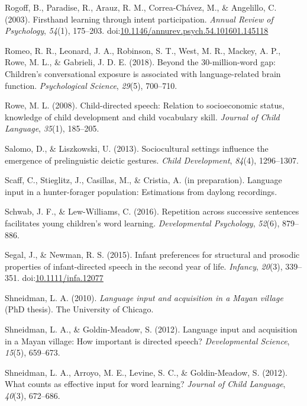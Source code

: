 \documentclass[floatsintext,man]{apa6}
\theoremstyle{definition}
\theoremstyle{definition}
\theoremstyle{definition}
\theoremstyle{remark}
\begin{document}
\hypertarget{ref-rogoff2003firsthand}{}
Rogoff, B., Paradise, R., Arauz, R. M., Correa-Chávez, M., \& Angelillo,
C. (2003). Firsthand learning through intent participation. \emph{Annual
Review of Psychology}, \emph{54}(1), 175--203.
doi:\href{https://doi.org/10.1146/annurev.psych.54.101601.145118}{10.1146/annurev.psych.54.101601.145118}

\hypertarget{ref-romeo2018beyond}{}
Romeo, R. R., Leonard, J. A., Robinson, S. T., West, M. R., Mackey, A.
P., Rowe, M. L., \& Gabrieli, J. D. E. (2018). Beyond the
30-million-word gap: Children's conversational exposure is associated
with language-related brain function. \emph{Psychological Science},
\emph{29}(5), 700--710.

\hypertarget{ref-rowe2008child}{}
Rowe, M. L. (2008). Child-directed speech: Relation to socioeconomic
status, knowledge of child development and child vocabulary skill.
\emph{Journal of Child Language}, \emph{35}(1), 185--205.

\hypertarget{ref-salomo2013sociocultural}{}
Salomo, D., \& Liszkowski, U. (2013). Sociocultural settings influence
the emergence of prelinguistic deictic gestures. \emph{Child
Development}, \emph{84}(4), 1296--1307.

\hypertarget{ref-scaffIPlanguage}{}
Scaff, C., Stieglitz, J., Casillas, M., \& Cristia, A. (in preparation).
Language input in a hunter-forager population: Estimations from daylong
recordings.

\hypertarget{ref-schwab2016repetition}{}
Schwab, J. F., \& Lew-Williams, C. (2016). Repetition across successive
sentences facilitates young children's word learning.
\emph{Developmental Psychology}, \emph{52}(6), 879--886.

\hypertarget{ref-segal2015infant}{}
Segal, J., \& Newman, R. S. (2015). Infant preferences for structural
and prosodic properties of infant-directed speech in the second year of
life. \emph{Infancy}, \emph{20}(3), 339--351.
doi:\href{https://doi.org/10.1111/infa.12077}{10.1111/infa.12077}

\hypertarget{ref-shneidman2010language}{}
Shneidman, L. A. (2010). \emph{Language input and acquisition in a Mayan
village} (PhD thesis). The University of Chicago.

\hypertarget{ref-shneidman2012language}{}
Shneidman, L. A., \& Goldin-Meadow, S. (2012). Language input and
acquisition in a Mayan village: How important is directed speech?
\emph{Developmental Science}, \emph{15}(5), 659--673.

\hypertarget{ref-shneidman2012counts}{}
Shneidman, L. A., Arroyo, M. E., Levine, S. C., \& Goldin-Meadow, S.
(2012). What counts as effective input for word learning? \emph{Journal
of Child Language}, \emph{40}(3), 672--686.
\end{document}
